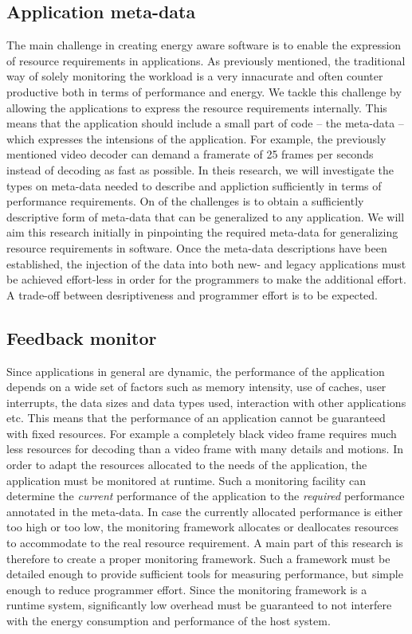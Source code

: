 \documentclass{article}
\begin{document}
\subsection{Application meta-data}
The main challenge in creating energy aware software is to enable the expression of resource requirements in applications.
As previously mentioned, the traditional way of solely monitoring the workload is a very innacurate and often counter productive both in terms of performance and energy.
We tackle this challenge by allowing the applications to express the resource requirements internally.
This means that the application should include a small part of code -- the meta-data -- which expresses the intensions of the application.
For example, the previously mentioned video decoder can demand a framerate of 25 frames per seconds instead of decoding as fast as possible.
In theis research, we will investigate the types on meta-data needed to describe and appliction sufficiently in terms of performance requirements.
On of the challenges is to obtain a sufficiently descriptive form of meta-data that can be generalized to any application.
We will aim this research initially in pinpointing the required meta-data for generalizing resource requirements in software.
Once the meta-data descriptions have been established, the injection of the data into both new- and legacy applications must be achieved effort-less in order for the programmers to make the additional effort.
A trade-off between desriptiveness and programmer effort is to be expected.

\subsection{Feedback monitor}
Since applications in general are dynamic, the performance of the application depends on a wide set of factors such as memory intensity, use of caches, user interrupts, the data sizes and data types used, interaction with other applications etc. 
This means that the performance of an application cannot be guaranteed with fixed resources.
For example a completely black video frame requires much less resources for decoding than a video frame with many details and motions.
In order to adapt the resources allocated to the needs of the application, the application must be monitored at runtime.
Such a monitoring facility can determine the \textit{current} performance of the application to the \textit{required} performance annotated in the meta-data.
In case the currently allocated performance is either too high or too low, the monitoring framework allocates or deallocates resources to accommodate to the real resource requirement.
A main part of this research is therefore to create a proper monitoring framework.
Such a framework must be detailed enough to provide sufficient tools for measuring performance, but simple enough to reduce programmer effort.
Since the monitoring framework is a runtime system, significantly low overhead must be guaranteed to not interfere with the energy consumption and performance of the host system.
\end{document}
